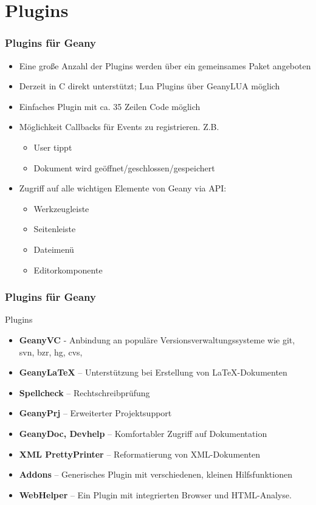 \section{Plugins}
\begin{frame}
  \frametitle{Plugins für Geany}
  \begin{block}{}
    \begin{itemize}
    \item Eine große Anzahl der Plugins werden über ein gemeinsames
      Paket angeboten
    \item Derzeit in C direkt unterstützt; Lua Plugins über GeanyLUA
      möglich
    \item Einfaches Plugin mit ca. 35 Zeilen Code möglich
    \item Möglichkeit Callbacks für Events zu registrieren. Z.B.
      \begin{itemize}
        \item User tippt
        \item Dokument wird geöffnet/geschlossen/gespeichert
      \end{itemize}
    \item Zugriff auf alle wichtigen Elemente von Geany via API:
      \begin{itemize}
        \item Werkzeugleiste
        \item Seitenleiste
        \item Dateimenü
        \item Editorkomponente
      \end{itemize}
    \end{itemize}
  \end{block}
\end{frame}

\begin{frame}
  \frametitle{Plugins für Geany}
  \begin{block}{Plugins}
    \begin{itemize}
    \item \textbf{GeanyVC} - Anbindung an populäre
        Versions\-ver\-waltungs\-systeme wie git, svn, bzr, hg, cvs,
    \item \textbf{GeanyLaTeX} -- Unterstützung bei Erstellung von
        \LaTeX-Dokumenten
    \item \textbf{Spellcheck} -- Rechtschreibprüfung
    \item \textbf{GeanyPrj} -- Erweiterter Projektsupport
    \item \textbf{GeanyDoc, Devhelp} -- Komfortabler Zugriff auf Dokumentation
    \item \textbf{XML PrettyPrinter} -- Reformatierung von XML-Dokumenten
    \item \textbf{Addons} -- Generisches Plugin mit verschiedenen,
          kleinen Hilfsfunktionen
    \item \textbf{WebHelper} -- Ein Plugin mit integrierten Browser
          und HTML-Analyse.
    \end{itemize}
  \end{block}
\end{frame}

